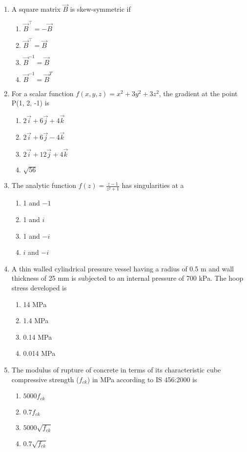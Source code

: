 \documentclass[journal,12pt,twocolumn]{IEEEtran}
\theoremstyle{remark}
\begin{document}
 \begin{enumerate}
		 
	 \item A square matrix $\vec{B}$ is skew-symmetric if
 \begin{enumerate}
  \item $\vec{B}^{\top} = - \vec{B}$
  \item $\vec{B}^{\top} = \vec{B}$
  \item $\vec{B}^{-1} =  \vec{B}$
  \item $\vec{B}^{-1} =  \vec{B}^{T}$
 \end{enumerate}

\item For a scalar function $f(x,y,z) = x^2+3y^2+3z^2$, the gradient at the point P(1, 2, -1) is
\begin{enumerate}
	\item $2\overrightarrow{i}+6\overrightarrow{j}+4\overrightarrow{k} $
	\item $2\overrightarrow{i}+6\overrightarrow{j}-4\overrightarrow{k} $
	\item $2\overrightarrow{i}+12\overrightarrow{j}+4\overrightarrow{k} $
	\item $\sqrt{56}$
\end{enumerate}

\item The analytic function $f(z) = \frac{z-1}{z^{2}+1}$ has singularities at a
	\begin{enumerate}
	\item 1 and $-1$
	\item 1 and $i$
	\item 1 and $-i$
	\item $i$ and $-i$
	\end{enumerate}


\item A thin walled cylindrical pressure vessel having a radius of 0.5 m and wall thickness of 25 mm is subjected to an internal pressure of 700 kPa. The hoop stress developed is 
	\begin{enumerate}
		\item 14 MPa
		\item 1.4 MPa
		\item 0.14 MPa
		\item 0.014 MPa
	\end{enumerate}		

\item The modulus of rupture of concrete in terms of its characteristic cube compressive strength ($f_{ck}$) in MPa according to IS 456:2000 is
	\begin{enumerate}
		\item $5000f_{ck}$
		\item $0.7f_{ck}$
		\item $5000\sqrt{f_{ck}}$
		\item $0.7\sqrt{f_{ck}}$
	\end{enumerate}



\end{enumerate}
\end{document}
